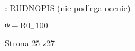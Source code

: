 \documentclass[a4paper,12pt]{article}
\begin{document}
: RUDNOPIS (nie podlega ocenie)

$\Psi-\mathrm{R}0_{-}100$

Strona 25 z27
\end{document}

